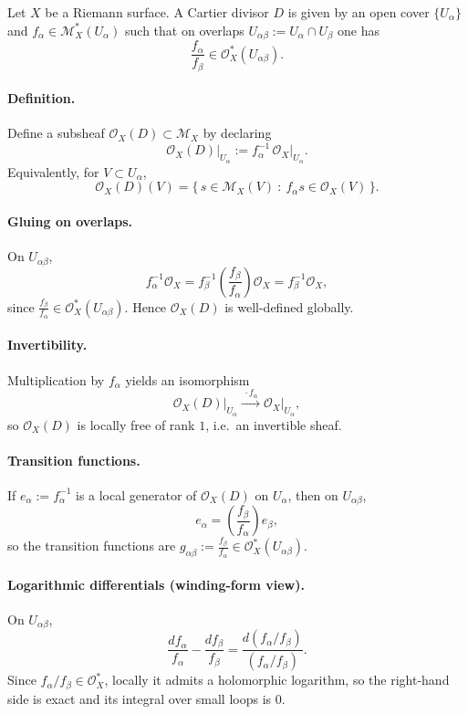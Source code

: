 \documentclass[11pt,openany]{article}
\begin{document}
Let $X$ be a Riemann surface. A Cartier divisor $D$ is given by an open cover
$\{U_\alpha\}$ and $f_\alpha\in \mathcal M_X^*(U_\alpha)$ such that on overlaps
$U_{\alpha\beta}:=U_\alpha\cap U_\beta$ one has
\[
\frac{f_\alpha}{f_\beta}\in \mathcal O_X^*(U_{\alpha\beta}).
\]

\paragraph{Definition.}
Define a subsheaf $\mathcal O_X(D)\subset \mathcal M_X$ by declaring
\[
\mathcal O_X(D)\big|_{U_\alpha} := f_\alpha^{-1}\,\mathcal O_X\big|_{U_\alpha}.
\]
Equivalently, for $V\subset U_\alpha$,
\[
\mathcal O_X(D)(V)=\{\, s\in \mathcal M_X(V)\ :\ f_\alpha s\in \mathcal O_X(V)\,\}.
\]

\paragraph{Gluing on overlaps.}
On $U_{\alpha\beta}$,
\[
f_\alpha^{-1}\mathcal O_X
=
f_\beta^{-1}\left(\frac{f_\beta}{f_\alpha}\right)\mathcal O_X
=
f_\beta^{-1}\mathcal O_X,
\]
since $\frac{f_\beta}{f_\alpha}\in \mathcal O_X^*(U_{\alpha\beta})$. Hence
$\mathcal O_X(D)$ is well-defined globally.

\paragraph{Invertibility.}
Multiplication by $f_\alpha$ yields an isomorphism
\[
\mathcal O_X(D)\big|_{U_\alpha} \xrightarrow{\ \cdot f_\alpha\ } \mathcal O_X\big|_{U_\alpha},
\]
so $\mathcal O_X(D)$ is locally free of rank $1$, i.e.\ an invertible sheaf.

\paragraph{Transition functions.}
If $e_\alpha:=f_\alpha^{-1}$ is a local generator of $\mathcal O_X(D)$ on $U_\alpha$, then
on $U_{\alpha\beta}$,
\[
e_\alpha=\left(\frac{f_\beta}{f_\alpha}\right)e_\beta,
\]
so the transition functions are $g_{\alpha\beta}:=\frac{f_\beta}{f_\alpha}\in\mathcal O_X^*(U_{\alpha\beta})$.

\paragraph{Logarithmic differentials (winding-form view).}
On $U_{\alpha\beta}$,
\[
\frac{df_\alpha}{f_\alpha}-\frac{df_\beta}{f_\beta}
=
\frac{d(f_\alpha/f_\beta)}{(f_\alpha/f_\beta)}.
\]
Since $f_\alpha/f_\beta\in \mathcal O_X^*$, locally it admits a holomorphic logarithm,
so the right-hand side is exact and its integral over small loops is $0$.
\end{document}
